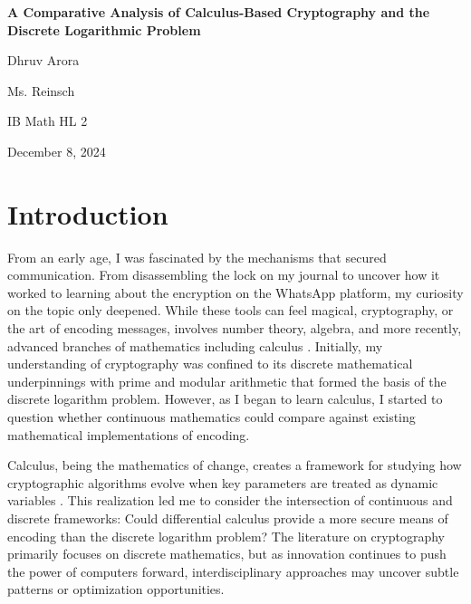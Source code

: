\documentclass[12pt]{article}
\begin{document}
\begin{titlepage}
    \begin{center}
        \vspace*{1in}

        \Large \textbf{A Comparative Analysis of Calculus-Based Cryptography and the Discrete Logarithmic Problem} \\

        \vspace{0.5in}

        \Large Dhruv Arora \\

        \vspace{0.25in}

        Ms. Reinsch

        \vspace{0.25in}

        IB Math HL 2

        \vspace{0.25in}

        December 8, 2024

        \vspace{1.5in}
    \end{center}
\end{titlepage}

\newpage

\section*{Introduction}

From an early age, I was fascinated by the mechanisms that secured communication. From disassembling the lock on my journal to uncover how it worked to learning about the encryption on the WhatsApp platform, my curiosity on the topic only deepened. While these tools can feel magical, cryptography, or the art of encoding messages, involves number theory, algebra, and more recently, advanced branches of mathematics including calculus \cite{Loxton1990}. Initially, my understanding of cryptography was confined to its discrete mathematical underpinnings with prime and modular arithmetic that formed the basis of the discrete logarithm problem. However, as I began to learn calculus, I started to question whether continuous mathematics could compare against existing mathematical implementations of encoding.

Calculus, being the mathematics of change, creates a framework for studying how cryptographic algorithms evolve when key parameters are treated as dynamic variables \cite{MITCalculus}. This realization led me to consider the intersection of continuous and discrete frameworks: Could differential calculus provide a more secure means of encoding than the discrete logarithm problem? The literature on cryptography primarily focuses on discrete mathematics, but as innovation continues to push the power of computers forward, interdisciplinary approaches may uncover subtle patterns or optimization opportunities.
\end{document}

